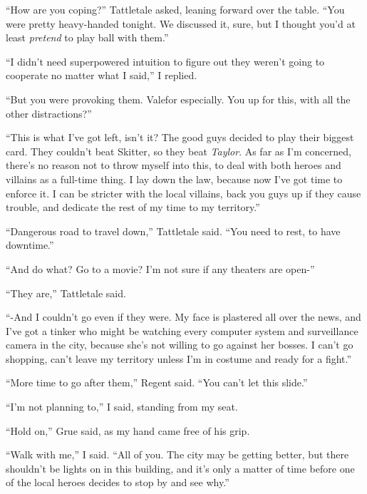 ``How are you coping?'' Tattletale asked, leaning forward over the table.  ``You were pretty heavy-handed tonight.  We discussed it, sure, but I thought you'd at least \emph{pretend} to play ball with them.''



``I didn't need superpowered intuition to figure out they weren't going to cooperate no matter what I said,'' I replied.



``But you were provoking them.  Valefor especially.  You up for this, with all the other distractions?''



``This is what I've got left, isn't it?  The good guys decided to play their biggest card.  They couldn't beat Skitter, so they beat \emph{Taylor}.  As far as I'm concerned, there's no reason not to throw myself into this, to deal with both heroes and villains as a full-time thing.  I lay down the law, because now I've got time to enforce it.  I can be stricter with the local villains, back you guys up if they cause trouble, and dedicate the rest of my time to my territory.''



``Dangerous road to travel down,'' Tattletale said.  ``You need to rest, to have downtime.''



``And do what?  Go to a movie?  I'm not sure if any theaters are open-''



``They are,'' Tattletale said.



``-And I couldn't go even if they were.  My face is plastered all over the news, and I've got a tinker who might be watching every computer system and surveillance camera in the city, because she's not willing to go against her bosses.  I can't go shopping, can't leave my territory unless I'm in costume and ready for a fight.''



``More time to go after them,'' Regent said.  ``You can't let this slide.''



``I'm not planning to,'' I said, standing from my seat.



``Hold on,'' Grue said, as my hand came free of his grip.



``Walk with me,'' I said.  ``All of you.  The city may be getting better, but there shouldn't be lights on in this building, and it's only a matter of time before one of the local heroes decides to stop by and see why.''




